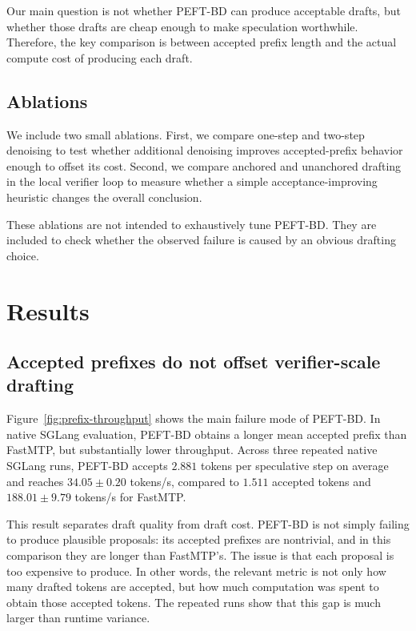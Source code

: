 \documentclass[11pt]{article}
\begin{document}
Our main question is not whether PEFT-BD can produce acceptable drafts, but whether those drafts are cheap enough to make speculation worthwhile. Therefore, the key comparison is between accepted prefix length and the actual compute cost of producing each draft. %

\subsection{Ablations}

We include two small ablations. First, we compare one-step and two-step denoising to test whether additional denoising improves accepted-prefix behavior enough to offset its cost. Second, we compare anchored and unanchored drafting in the local verifier loop to measure whether a simple acceptance-improving heuristic changes the overall conclusion.

These ablations are not intended to exhaustively tune PEFT-BD. They are included to check whether the observed failure is caused by an obvious drafting choice. %


\section{Results}

\subsection{Accepted prefixes do not offset verifier-scale drafting}

Figure~\ref{fig:prefix-throughput} shows the main failure mode of PEFT-BD. In native SGLang evaluation, PEFT-BD obtains a longer mean accepted prefix than FastMTP, but substantially lower throughput. Across three repeated native SGLang runs, PEFT-BD accepts $2.881$ tokens per speculative step on average and reaches $34.05 \pm 0.20$ tokens/s, compared to $1.511$ accepted tokens and $188.01 \pm 9.79$ tokens/s for FastMTP.

This result separates draft quality from draft cost. PEFT-BD is not simply failing to produce plausible proposals: its accepted prefixes are nontrivial, and in this comparison they are longer than FastMTP's. The issue is that each proposal is too expensive to produce. In other words, the relevant metric is not only how many drafted tokens are accepted, but how much computation was spent to obtain those accepted tokens. The repeated runs show that this gap is much larger than runtime variance.
\end{document}
